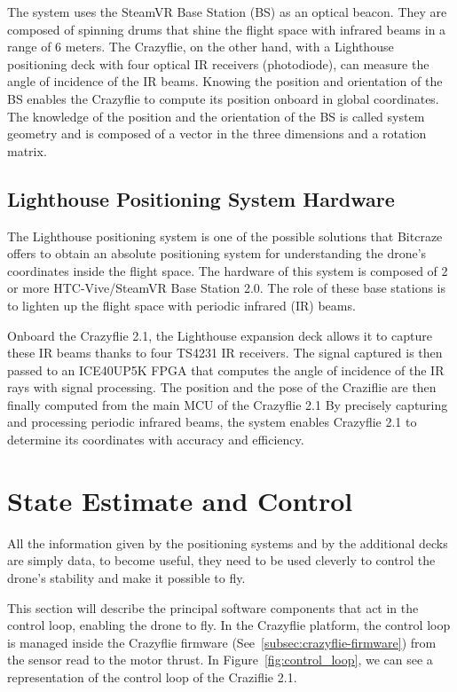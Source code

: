 The system uses the SteamVR Base Station (BS) as an optical beacon. 
They are composed of spinning drums that shine the flight space with infrared beams in a range of 6 meters. 
The Crazyflie, on the other hand, with a Lighthouse positioning deck with four optical IR receivers (photodiode), can measure the angle of incidence of the IR beams. 
Knowing the position and orientation of the BS enables the Crazyflie to compute its position onboard in global coordinates. 
The knowledge of the position and the orientation of the BS is called system geometry and is composed of a vector in the three dimensions and a rotation matrix. 


\subsection{Lighthouse Positioning System Hardware}\label{subsec:lighthouse_hardware}
The Lighthouse positioning system is one of the possible solutions that Bitcraze offers to obtain an absolute positioning system for understanding the drone's coordinates inside the flight space. 
The hardware of this system is composed of 2 or more HTC-Vive/SteamVR Base Station 2.0. 
The role of these base stations is to lighten up the flight space with periodic infrared (IR) beams.

Onboard the Crazyflie 2.1, the Lighthouse expansion deck allows it to capture these IR beams thanks to four TS4231 IR receivers. 
The signal captured is then passed to an ICE40UP5K FPGA that computes the angle of incidence of the IR rays with signal processing. 
The position and the pose of the Craziflie are then finally computed from the main MCU of the Crazyflie 2.1
By precisely capturing and processing periodic infrared beams, the system enables Crazyflie 2.1 to determine its coordinates with accuracy and efficiency.

\section{State Estimate and Control}\label{sec:state_estimate_and_control}
All the information given by the positioning systems and by the additional decks are simply data,
to become useful, they need to be used cleverly to control the drone's stability and make it possible to fly. 

This section will describe the principal software components that act in the control loop, enabling the drone to fly.
In the Crazyflie platform, the control loop is managed inside the Crazyflie firmware (See~\ref{subsec:crazyflie-firmware}) from the sensor read to the motor thrust.
In Figure~\ref{fig:control_loop}, we can see a representation of the control loop of the Craziflie 2.1. 

